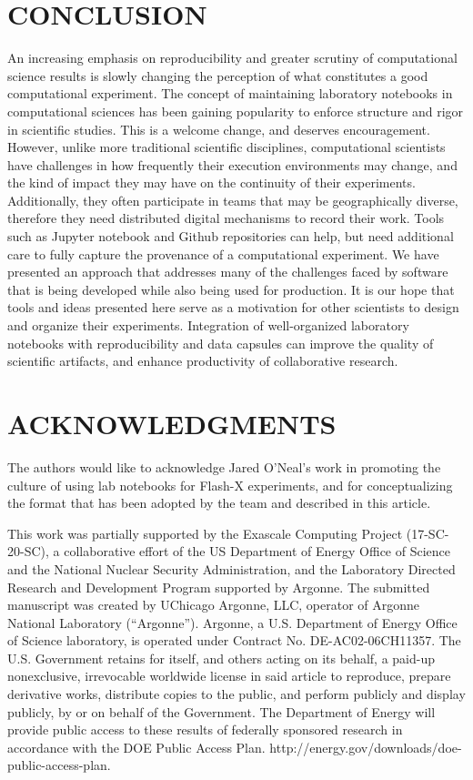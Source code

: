\documentclass{IEEEcsmag}
\begin{document}
\section {CONCLUSION} \label{sc:conclusion}
An increasing emphasis on reproducibility and greater scrutiny of computational science results is slowly changing the perception of what constitutes a good computational experiment. The concept of maintaining laboratory notebooks in computational sciences has been gaining popularity to enforce structure and rigor in scientific studies. This is a welcome change, and deserves encouragement. However, unlike more traditional scientific disciplines, computational scientists have challenges in how frequently their execution environments may change, and the kind of impact they may have on the continuity of their experiments. Additionally, they often participate in teams that may be geographically diverse, therefore they need distributed digital mechanisms to record their work. Tools such as Jupyter notebook and Github repositories can help, but need additional care to fully capture the provenance of a computational experiment. We have presented an approach that addresses many of the challenges faced by software that is being developed while also being used for production. It is our hope that tools and ideas presented here serve as a motivation for other scientists to design and organize their experiments. Integration of well-organized laboratory notebooks with reproducibility and data capsules can improve the quality of scientific artifacts, and enhance productivity of collaborative research.


\section {ACKNOWLEDGMENTS}

The authors would like to acknowledge Jared O'Neal's work in promoting the culture of using lab notebooks for Flash-X experiments, and for conceptualizing the format that has been adopted by the team and described in this article. 

This work was partially supported by the Exascale Computing Project (17-SC-20-SC), a collaborative effort of the US Department of Energy Office of Science and the National Nuclear Security Administration, and the Laboratory Directed Research and Development Program supported by Argonne. The submitted manuscript was created by UChicago Argonne, LLC, operator of Argonne National Laboratory (“Argonne”). Argonne, a U.S. Department of Energy Office of Science laboratory, is operated under Contract No. DE-AC02-06CH11357. The U.S. Government retains for itself, and others acting on its behalf, a paid-up nonexclusive, irrevocable worldwide license in said article to reproduce, prepare derivative works, distribute copies to the public, and perform publicly and display publicly, by or on behalf of the Government. The Department of Energy will provide public access to these results of federally sponsored research in accordance with the DOE Public Access Plan. http://energy.gov/downloads/doe-public-access-plan. 
\end{document}
